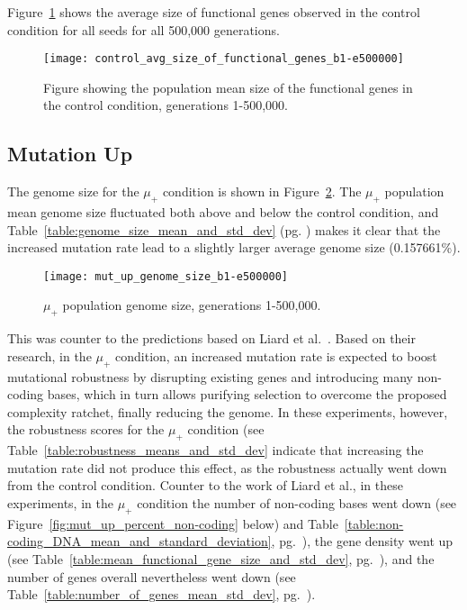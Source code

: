 Figure~\ref{fig:control_avg_size_of_functional_genes_b1-e500000} shows the average size of functional genes observed in the control condition for all seeds for all 500,000 generations.
\begin{figure}[H]
	\texttt{[image: control\_avg\_size\_of\_functional\_genes\_b1-e500000]}
	\caption[Control avg. size of functional genes]{Figure showing the population mean size of the functional genes in the control condition, generations 1-500,000.}
	\label{fig:control_avg_size_of_functional_genes_b1-e500000}
\end{figure}

\subsection{Mutation Up}
The genome size for the $\mu_+$ condition is shown in Figure~\ref{fig:mut_up_genome_size}. The $\mu_+$ population mean genome size fluctuated both above and below the control condition, and Table~\ref{table:genome_size_mean_and_std_dev} (pg. \pageref{table:genome_size_mean_and_std_dev}) makes it clear that the increased mutation rate lead to a slightly larger average genome size (0.157661\%). 
\begin{figure}[H]
	\centering
	\texttt{[image: mut\_up\_genome\_size\_b1-e500000]}
	\caption[Mutation down genome size]{$\mu_+$ population genome size, generations 1-500,000.}
	\label{fig:mut_up_genome_size}
\end{figure}

This was counter to the predictions based on Liard et al.~\cite{Liard.2018}. Based on their research, in the $\mu_+$ condition, an increased mutation rate is expected to boost mutational robustness by disrupting existing genes and introducing many non-coding bases, which in turn allows purifying selection to overcome the proposed complexity ratchet, finally reducing the genome. In these experiments, however, the robustness scores for the $\mu_+$ condition (see Table~\ref{table:robustness_means_and_std_dev} indicate that increasing the mutation rate did not produce this effect, as the robustness actually went down from the control condition. Counter to the work of Liard et al., in these experiments, in the $\mu_+$ condition the number of non-coding bases went down (see Figure~\ref{fig:mut_up_percent_non-coding} below) and Table~\ref{table:non-coding_DNA_mean_and_standard_deviation}, pg.~\pageref{table:non-coding_DNA_mean_and_standard_deviation}), the gene density went up (see Table~\ref{table:mean_functional_gene_size_and_std_dev}, pg.~\pageref{table:mean_functional_gene_size_and_std_dev}), and the number of genes overall nevertheless went down (see Table~\ref{table:number_of_genes_mean_std_dev}, pg.~\pageref{table:number_of_genes_mean_std_dev}).

